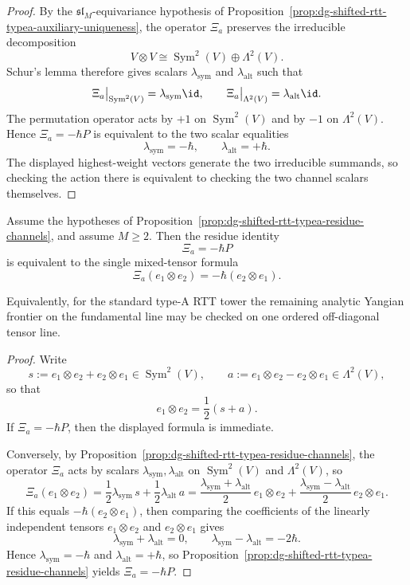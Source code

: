 \begin{proof}
By the $\mathfrak{sl}_M$-equivariance hypothesis of
Proposition~\ref{prop:dg-shifted-rtt-typea-auxiliary-uniqueness}, the
operator $\Xi_a$ preserves the irreducible decomposition
\[
V\otimes V \cong \operatorname{Sym}^2(V)\oplus \Lambda^2(V).
\]
Schur's lemma therefore gives scalars $\lambda_{\mathrm{sym}}$ and
$\lambda_{\mathrm{alt}}$ such that
\[
\Xi_a\big|_{\operatorname{Sym}^2(V)}=\lambda_{\mathrm{sym}}\id,
\qquad
\Xi_a\big|_{\Lambda^2(V)}=\lambda_{\mathrm{alt}}\id.
\]
The permutation operator acts by $+1$ on $\operatorname{Sym}^2(V)$ and by $-1$ on
$\Lambda^2(V)$.  Hence $\Xi_a=-\hbar P$ is equivalent to the two scalar
equalities
\[
\lambda_{\mathrm{sym}}=-\hbar,
\qquad
\lambda_{\mathrm{alt}}=+\hbar.
\]
The displayed highest-weight vectors generate the two irreducible
summands, so checking the action there is equivalent to checking the two
channel scalars themselves.
\end{proof}

\begin{corollary}
\label{cor:dg-shifted-rtt-typea-single-line}
Assume the hypotheses of
Proposition~\ref{prop:dg-shifted-rtt-typea-residue-channels}, and
assume $M\ge 2$.  Then the residue identity
\[
\Xi_a=-\hbar P
\]
is equivalent to the single mixed-tensor formula
\[
\Xi_a(e_1\otimes e_2)=-\hbar(e_2\otimes e_1).
\]

Equivalently, for the standard type-A RTT tower the remaining analytic
Yangian frontier on the fundamental line may be checked on one ordered
off-diagonal tensor line.
\end{corollary}

\begin{proof}
Write
\[
s:=e_1\otimes e_2+e_2\otimes e_1\in \operatorname{Sym}^2(V),
\qquad
a:=e_1\otimes e_2-e_2\otimes e_1\in \Lambda^2(V),
\]
so that
\[
e_1\otimes e_2=\frac{1}{2}(s+a).
\]
If $\Xi_a=-\hbar P$, then the displayed formula is immediate.

Conversely, by
Proposition~\ref{prop:dg-shifted-rtt-typea-residue-channels}, the
operator $\Xi_a$ acts by scalars
$\lambda_{\mathrm{sym}},\lambda_{\mathrm{alt}}$ on
$\operatorname{Sym}^2(V)$ and $\Lambda^2(V)$, so
\[
\Xi_a(e_1\otimes e_2)
=\frac{1}{2}\lambda_{\mathrm{sym}}\,s
+\frac{1}{2}\lambda_{\mathrm{alt}}\,a
=\frac{\lambda_{\mathrm{sym}}+\lambda_{\mathrm{alt}}}{2}\,
e_1\otimes e_2
+\frac{\lambda_{\mathrm{sym}}-\lambda_{\mathrm{alt}}}{2}\,
e_2\otimes e_1.
\]
If this equals $-\hbar(e_2\otimes e_1)$, then comparing the
coefficients of the linearly independent tensors
$e_1\otimes e_2$ and $e_2\otimes e_1$ gives
\[
\lambda_{\mathrm{sym}}+\lambda_{\mathrm{alt}}=0,
\qquad
\lambda_{\mathrm{sym}}-\lambda_{\mathrm{alt}}=-2\hbar.
\]
Hence $\lambda_{\mathrm{sym}}=-\hbar$ and
$\lambda_{\mathrm{alt}}=+\hbar$, so
Proposition~\ref{prop:dg-shifted-rtt-typea-residue-channels} yields
$\Xi_a=-\hbar P$.
\end{proof}

